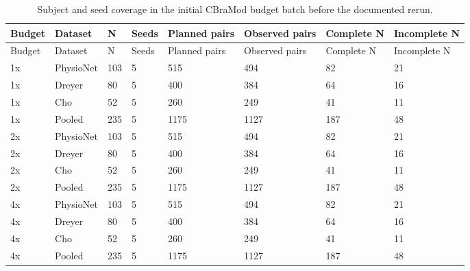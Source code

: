 \begin{longtable}{llllllll}
\caption{Subject and seed coverage in the initial CBraMod budget batch before the documented rerun.}\label{tab:budget_cb_missing}\\
\toprule
Budget & Dataset & N & Seeds & Planned pairs & Observed pairs & Complete N & Incomplete N \\
\midrule
\endfirsthead
\toprule
Budget & Dataset & N & Seeds & Planned pairs & Observed pairs & Complete N & Incomplete N \\
\midrule
\endhead
1x & PhysioNet & 103 & 5 & 515 & 494 & 82 & 21 \\
1x & Dreyer & 80 & 5 & 400 & 384 & 64 & 16 \\
1x & Cho & 52 & 5 & 260 & 249 & 41 & 11 \\
1x & Pooled & 235 & 5 & 1175 & 1127 & 187 & 48 \\
2x & PhysioNet & 103 & 5 & 515 & 494 & 82 & 21 \\
2x & Dreyer & 80 & 5 & 400 & 384 & 64 & 16 \\
2x & Cho & 52 & 5 & 260 & 249 & 41 & 11 \\
2x & Pooled & 235 & 5 & 1175 & 1127 & 187 & 48 \\
4x & PhysioNet & 103 & 5 & 515 & 494 & 82 & 21 \\
4x & Dreyer & 80 & 5 & 400 & 384 & 64 & 16 \\
4x & Cho & 52 & 5 & 260 & 249 & 41 & 11 \\
4x & Pooled & 235 & 5 & 1175 & 1127 & 187 & 48 \\
\bottomrule
\end{longtable}
